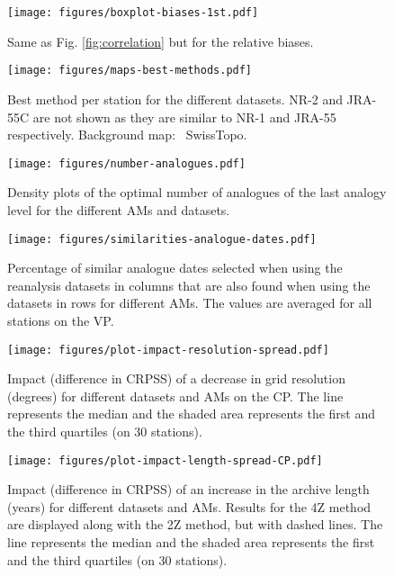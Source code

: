 \documentclass{ametsoc}
\begin{document}
\begin{figure*}[t]
	\noindent\texttt{[image: figures/boxplot-biases-1st.pdf]}\\
	\caption{Same as Fig. \ref{fig:correlation} but for the relative biases.}
	\label{fig:biases}
\end{figure*}

\begin{figure*}[t]
	\noindent\texttt{[image: figures/maps-best-methods.pdf]}\\
	\caption{Best method per station for the different datasets. NR-2 and JRA-55C are not shown as they are similar to NR-1 and JRA-55 respectively. Background map: \textcopyright\ SwissTopo.}
	\label{fig:map_best_methods}
\end{figure*}

\begin{figure}[t]
	\noindent\texttt{[image: figures/number-analogues.pdf]}\\
	\caption{Density plots of the optimal number of analogues of the last analogy level for the different AMs and datasets.}
	\label{fig:number_analogues}
\end{figure}

\begin{figure}[t]
	\noindent\texttt{[image: figures/similarities-analogue-dates.pdf]}\\
	\caption{Percentage of similar analogue dates selected when using the reanalysis datasets in columns that are also found when using the datasets in rows for different AMs. The values are averaged for all stations on the VP.}
	\label{fig:similarities_analogue_dates}
\end{figure}

\begin{figure}[t]
	\noindent\texttt{[image: figures/plot-impact-resolution-spread.pdf]}\\
	\caption{Impact (difference in CRPSS) of a decrease in grid resolution (degrees) for different datasets and AMs on the CP. The line represents the median and the shaded area represents the first and the third quartiles (on 30 stations).}
	\label{fig:plot_impact_resolution}
\end{figure}

\begin{figure}[t]
	\noindent\texttt{[image: figures/plot-impact-length-spread-CP.pdf]}\\
	\caption{Impact (difference in CRPSS) of an increase in the archive length (years) for different datasets and AMs. Results for the 4Z method are displayed along with the 2Z method, but with dashed lines. The line represents the median and the shaded area represents the first and the third quartiles (on 30 stations).}
	\label{fig:plot_impact_length_CP}
\end{figure}
\end{document}
